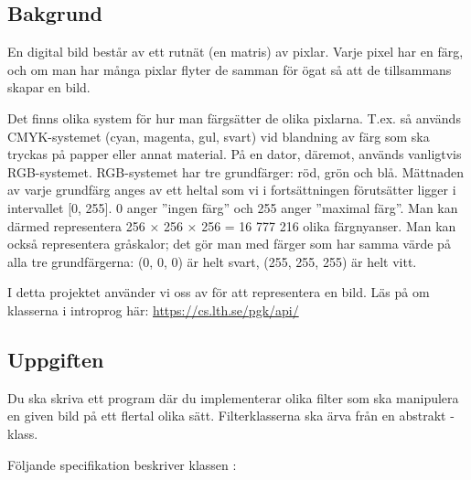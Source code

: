 

\subsection{Bakgrund}

En digital bild består av ett rutnät (en matris) av pixlar. Varje pixel har en färg, och om man har många pixlar flyter de samman för ögat så att de tillsammans skapar en bild.

Det finns olika system för hur man färgsätter de olika pixlarna. T.ex. så används CMYK-systemet (cyan, magenta, gul, svart) vid blandning av färg som ska tryckas på papper eller annat material. På en dator, däremot, används vanligtvis RGB-systemet. RGB-systemet har tre grundfärger: röd, grön och blå. Mättnaden av varje grundfärg anges av ett heltal som vi i fortsättningen förutsätter ligger i intervallet [0, 255]. 0 anger ''ingen färg'' och 255 anger ''maximal färg''. Man kan därmed representera 256 × 256 × 256 = 16 777 216 olika färgnyanser. Man kan också representera gråskalor; det gör man med färger som har samma värde på alla tre grundfärgerna: (0, 0, 0) är helt svart, (255, 255, 255) är helt vitt.

I detta projektet använder vi oss av  för att representera en bild. Läs på om klasserna i introprog här: 
\url{https://cs.lth.se/pgk/api/}

\subsection{Uppgiften}
Du ska skriva ett program där du implementerar olika filter som ska manipulera en given bild på ett flertal olika sätt. 
Filterklasserna ska ärva från en abstrakt -klass.

Följande specifikation beskriver klassen :

